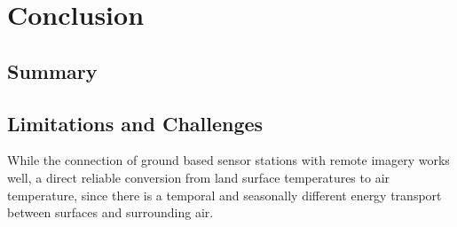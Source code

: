 \documentclass[12pt,a4paper, english,twoside]{article}
\begin{document}
  
\newpage
\section{Conclusion}\label{sec:conclusion}
\subsection{Summary}


\subsection{Limitations and Challenges}
While the connection of ground based sensor stations with remote imagery works well, a direct reliable conversion from land surface temperatures to air temperature, since there is a temporal and seasonally different energy transport between surfaces and surrounding air. 
\end{document}
